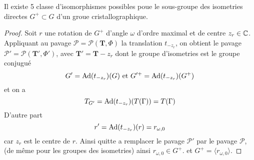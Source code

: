 \begin{theorem}
	Il existe 5 classe d'isomorphismes possibles poue le sous-groupe des
	isometries directes $G^+ \subset G$ d'un groue cristallographique.
\end{theorem}
\begin{proof}
	Soit $r$ une rotation de $G^+$ d'angle $\omega$ d'ordre maximal
	et de centre $z_r \in \mathbb{C}$.
	Appliquant au pavage $\mathcal{P} = \mathcal{P}(\mathbf{T}, \Phi)$ la
	translation $t_{-z_r}$, on obtient le pavage
	$\mathcal{P}' = \mathcal{P}(\mathbf{T}', \Phi')$, avec
	$\mathbf{T}' = \mathbf{T} - z_r$ dont le groupe d'isometries est le groupe
	conjugué
	\begin{equation*}
		G' = \operatorname{Ad}(t_{-z_r})(G) \textrm{ et } G'^+ = \operatorname{Ad}(t_{-z_r})(G^+) 
	\end{equation*}
	et on a 
	\begin{equation*}
		T_{G'} = \operatorname{Ad}(t_{-z_r})(T(\Gamma)) = T(\Gamma)
	\end{equation*}
	D'autre part
	\begin{equation*}
		r' = \operatorname{Ad}(t_{-z_r})(r) = r_{\omega, 0}
	\end{equation*}
	car $z_r$ est le centre de $r$. Ainsi quitte a remplacer le pavage
	$\mathcal{P}'$ par le pavage $\mathcal{P}$, (de même pour les groupes des
	isometries) ainsi $r_{\omega, 0} \in G^+$. et
	$G^+ = \langle r_{\omega, 0} \rangle$.


\end{proof}

